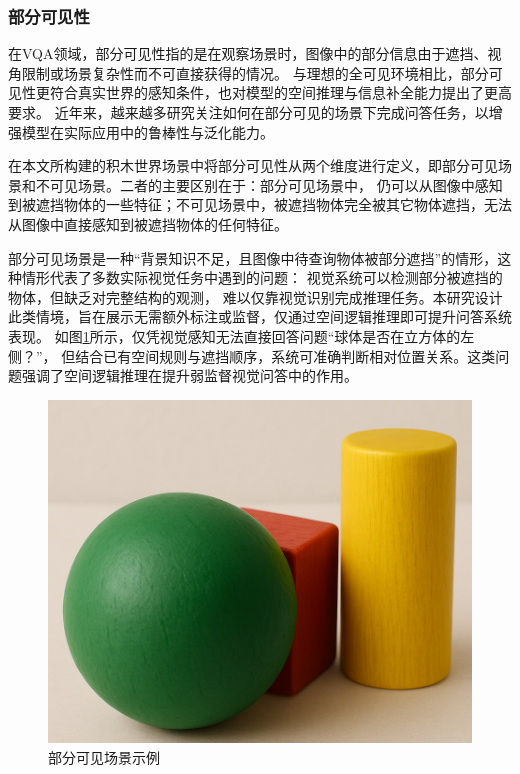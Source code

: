 \subsubsection{部分可见性}
在VQA领域，部分可见性指的是在观察场景时，图像中的部分信息由于遮挡、视角限制或场景复杂性而不可直接获得的情况。
与理想的全可见环境相比，部分可见性更符合真实世界的感知条件，也对模型的空间推理与信息补全能力提出了更高要求。
近年来，越来越多研究关注如何在部分可见的场景下完成问答任务，以增强模型在实际应用中的鲁棒性与泛化能力。

在本文所构建的积木世界场景中将部分可见性从两个维度进行定义，即部分可见场景和不可见场景。二者的主要区别在于：部分可见场景中，
仍可以从图像中感知到被遮挡物体的一些特征；不可见场景中，被遮挡物体完全被其它物体遮挡，无法从图像中直接感知到被遮挡物体的任何特征。

部分可见场景是一种“背景知识不足，且图像中待查询物体被部分遮挡”的情形，这种情形代表了多数实际视觉任务中遇到的问题：
视觉系统可以检测部分被遮挡的物体，但缺乏对完整结构的观测，
难以仅靠视觉识别完成推理任务。本研究设计此类情境，旨在展示无需额外标注或监督，仅通过空间逻辑推理即可提升问答系统表现。
如图\ref{fig:partial-observable-scene-example}所示，仅凭视觉感知无法直接回答问题“球体是否在立方体的左侧？”，
但结合已有空间规则与遮挡顺序，系统可准确判断相对位置关系。这类问题强调了空间逻辑推理在提升弱监督视觉问答中的作用。
\begin{figure}[h]
\centering
\includegraphics[scale=0.25]{figures/部分可见场景示例.png}
\caption{部分可见场景示例}
\label{fig:partial-observable-scene-example}
\end{figure}

